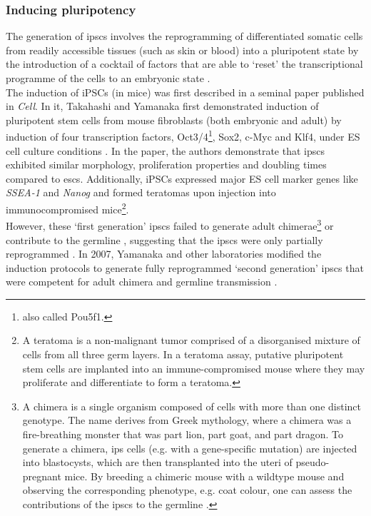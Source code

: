 \newpage

\subsubsection{Inducing pluripotency}

The generation of \glspl{ipsc} involves the reprogramming of differentiated somatic cells from readily accessible tissues (such as skin or blood) into a pluripotent state by the introduction of a cocktail of factors that are able to `reset' the transcriptional programme of the cells to an embryonic state \cite{saha2009technical}. \\

The induction of iPSCs (in mice) was first described in a seminal paper published in \textit{Cell}.
In it, Takahashi and Yamanaka first demonstrated induction of pluripotent stem cells from mouse fibroblasts (both embryonic and adult) by induction of four transcription factors, Oct3/4\footnote{also called Pou5f1.}, Sox2, c-Myc and Klf4, under ES cell culture conditions \cite{takahashi2006induction}.
In the paper, the authors demonstrate that \glspl{ipsc} exhibited similar morphology, proliferation properties and doubling times compared to \glspl{esc}.
Additionally, iPSCs expressed major ES cell marker genes like \textit{SSEA-1} and \textit{Nanog} and formed teratomas upon injection into immunocompromised mice\footnote{A teratoma is a non-malignant tumor comprised of a disorganised mixture of cells from all three germ layers. 
In a teratoma assay, putative pluripotent stem cells are implanted into an immune-compromised mouse where they may proliferate and differentiate to form a teratoma.}.\\ 

However, these `first generation' \glspl{ipsc} failed to generate adult chimerae\footnote{A chimera is a single organism composed of cells with more than one distinct genotype.
The name derives from Greek mythology, where a chimera was a fire-breathing monster that was part lion, part goat, and part dragon. 
To generate a chimera, \gls{ips} cells (e.g. with a gene-specific mutation) are injected into blastocysts, which are then transplanted into the uteri of pseudo-pregnant mice.
By breeding a chimeric mouse with a wildtype mouse and observing the corresponding phenotype, e.g. coat colour, one can assess the contributions of the \glspl{ipsc} to the germline \cite{okita2007generation}.} or contribute to the germline \cite{takahashi2006induction}, suggesting that the \glspl{ipsc} were only partially reprogrammed \cite{omole2018ten}. 
In 2007, Yamanaka and other laboratories modified the induction protocols to generate fully reprogrammed `second generation' \glspl{ipsc} that were competent for adult chimera and germline transmission \cite{maherali2007directly, wernig2007vitro, okita2007generation}.\\


